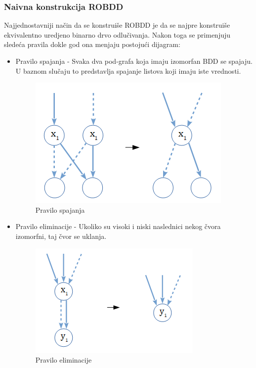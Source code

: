 \subsubsection{Naivna konstrukcija ROBDD}
\label{subsubsec:naiveROBDDConstruction}

Najjednostavniji na\v{c}in da se konstrui\v{s}e ROBDD je da se najpre konstrui\v{s}e ekvivalentno uredjeno binarno drvo odlu\v{c}ivanja. Nakon toga se primenjuju slede\'c{}a pravila dokle god ona menjaju postoju\'c{}i dijagram:
\begin{itemize}
    \item Pravilo spajanja - Svaka dva pod-grafa koja imaju izomorfan BDD se spajaju. U baznom slu\v{c}aju to predstavlja spajanje listova koji imaju iste vrednosti.

    \begin{figure}[H]
        \centering
        \includegraphics[scale=0.6]{slike/pravilo_spajanja.PNG}
        \caption{Pravilo spajanja}
        \label{fig:reductionRule}
    \end{figure}

    \item Pravilo eliminacije - Ukoliko su visoki i niski naslednici nekog \v{c}vora izomorfni, taj \v{c}vor se uklanja.

    \begin{figure}[H]
        \centering
        \includegraphics[scale=0.6]{slike/pravilo_eliminacije.PNG}
        \caption{Pravilo eliminacije}
        \label{fig:eliminationRule}
    \end{figure}
\end{itemize}


